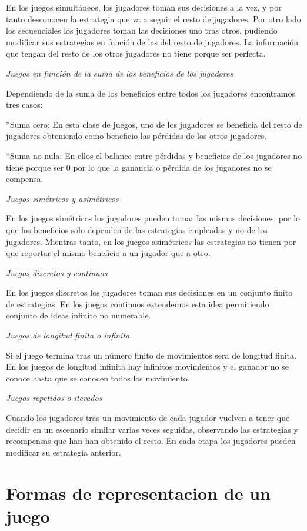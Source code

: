 \documentclass[12pt,a4paper,]{book}
\numberwithin{dummy}{section}
\theoremstyle{ocrenumbox}
\theoremstyle{blacknumex}
\theoremstyle{blacknumbox}
\theoremstyle{ocrenum}
\theoremstyle{ocrenum}
\begin{document}
En los juegos simultáneos, los jugadores toman sus decisiones a la vez,
y por tanto desconocen la estrategia que va a seguir el resto de
jugadores. Por otro lado los secuenciales los jugadores toman las
decisiones uno tras otros, pudiendo modificar sus estrategias en función
de las del resto de jugadores. La información que tengan del resto de
los otros jugadores no tiene porque ser perfecta.

\emph{Juegos en función de la suma de los beneficios de los jugadores}

Dependiendo de la suma de los beneficios entre todos los jugadores
encontramos tres casos:

*Suma cero: En esta clase de juegos, uno de los jugadores se beneficia
del resto de jugadores obteniendo como beneficio las pérdidas de los
otros jugadores.

*Suma no nula: En ellos el balance entre pérdidas y beneficios de los
jugadores no tiene porque ser 0 por lo que la ganancia o pérdida de los
jugadores no se compensa.

\emph{Juegos simétricos y asimétricos}

En los juegos simétricos los jugadores pueden tomar las mismas
decisiones, por lo que los beneficios solo dependen de las estrategias
empleadas y no de los jugadores. Mientras tanto, en los juegos
asimétricos las estrategias no tienen por que reportar el mismo
beneficio a un jugador que a otro.

\emph{Juegos discretos y continuos}

En los juegos discretos los jugadores toman sus decisiones en un
conjunto finito de estrategias. En los juegos continuos extendemos esta
idea permitiendo conjunto de ideas infinito no numerable.

\emph{Juegos de longitud finita o infinita}

Si el juego termina tras un número finito de movimientos sera de
longitud finita. En los juegos de longitud infinita hay infinitos
movimientos y el ganador no se conoce hasta que se conocen todos los
movimiento.

\emph{Juegos repetidos o iterados}

Cuando los jugadores tras un movimiento de cada jugador vuelven a tener
que decidir en un escenario similar varias veces seguidas, observando
las estrategias y recompensas que han han obtenido el resto. En cada
etapa los jugadores pueden modificar su estrategia anterior.

\hypertarget{Seccion22}{%
\section{Formas de representacion de un juego}\label{Seccion22}}
\end{document}
